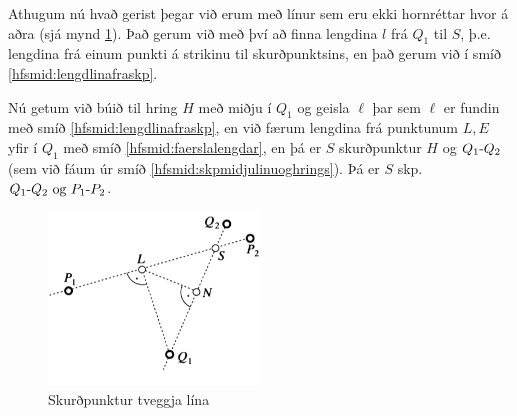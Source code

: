\begin{frame}
  Athugum nú hvað gerist þegar við erum með línur sem eru ekki
  hornréttar hvor á aðra (sjá mynd \ref{fig:mmcon5}).
  Það gerum við með því að finna lengdina \(l\) frá \(Q_1\) til \(S\),
  þ.e. lengdina frá einum punkti á strikinu til skurðpunktsins, en það
  gerum við í smíð \ref{hfsmid:lengdlinafraskp}.

\end{frame}

\begin{frame}
  \begin{hfsmid}\label{hfsmid:skptveggjalina}
    Nú getum við búið til hring \(H\)
    með miðju í \(Q_1\) og geisla \(\ell\) þar sem \(\ell\)
    er fundin með smíð \ref{hfsmid:lengdlinafraskp}, en við færum
    lengdina frá punktunum \(L,E\) yfir í \(Q_1\)
    með smíð \ref{hfsmid:faerslalengdar}, en þá er \(S\)
    skurðpunktur \(H\) og \(\lin{Q_1}{Q_2}\)
    (sem við fáum úr smíð \ref{hfsmid:skpmidjulinuoghrings}).  Þá er
    \(S\) skp. \(\lin{Q_1}{Q_2} \Og \lin{P_1}{P_2}\).
  \end{hfsmid}
\end{frame}

\begin{frame}
  \begin{figure}[H]
    \centering
    \includegraphics[width=0.5\textwidth]{MohrMaschCon5.png}
    \caption{Skurðpunktur tveggja lína}
    \label{fig:mmcon5}
  \end{figure}
\end{frame}

